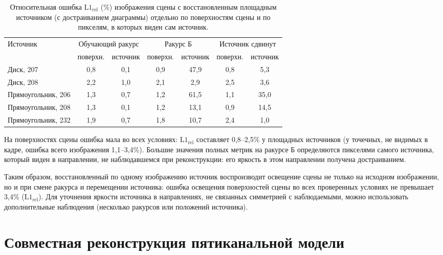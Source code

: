 \begin{table}[htbp]
    \centering
    \small
    \setlength{\tabcolsep}{3.5pt}
    \caption{Относительная ошибка $\mathrm{L1}_{\mathrm{rel}}$ (\%) изображения сцены с восстановленным площадным источником (с достраиванием диаграммы) отдельно по поверхностям сцены и по пикселям, в которых виден сам источник.}
    \label{tab:generalization-masked}
    \begin{tabular}{lcccccc}
        \toprule
        \multirow{2}{*}{Источник} & \multicolumn{2}{c}{Обучающий ракурс} & \multicolumn{2}{c}{Ракурс Б} & \multicolumn{2}{c}{Источник сдвинут} \\
        \cmidrule(lr){2-3}\cmidrule(lr){4-5}\cmidrule(lr){6-7}
        & поверхн. & источник & поверхн. & источник & поверхн. & источник \\
        \midrule
        Диск, 207          & 0,8 & 0,1 & 0,9 & 47,9 & 0,8 & 5,3 \\
        Диск, 208          & 2,2 & 1,0 & 2,1 & 2,9  & 2,5 & 3,6 \\
        Прямоугольник, 206 & 1,3 & 0,7 & 1,2 & 61,5 & 1,1 & 35,0 \\
        Прямоугольник, 208 & 1,3 & 0,1 & 1,2 & 13,1 & 0,9 & 14,5 \\
        Прямоугольник, 232 & 1,9 & 0,7 & 1,8 & 10,7 & 2,4 & 1,0 \\
        \bottomrule
    \end{tabular}
\end{table}

На поверхностях сцены ошибка мала во всех условиях: $\mathrm{L1}_{\mathrm{rel}}$ составляет 0,8--2,5\% у площадных источников (у точечных, не видимых в кадре, ошибка всего изображения 1,1--3,4\%). Большие значения полных метрик на ракурсе Б определяются пикселями самого источника, который виден в направлении, не наблюдавшемся при реконструкции: его яркость в этом направлении получена достраиванием.

Таким образом, восстановленный по одному изображению источник воспроизводит освещение сцены не только на исходном изображении, но и при смене ракурса и перемещении источника: ошибка освещения поверхностей сцены во всех проверенных условиях не превышает 3,4\% ($\mathrm{L1}_{\mathrm{rel}}$). Для уточнения яркости источника в направлениях, не связанных симметрией с наблюдаемыми, можно использовать дополнительные наблюдения (несколько ракурсов или положений источника).

\section{Совместная реконструкция пятиканальной модели}
\label{sec:joint}

